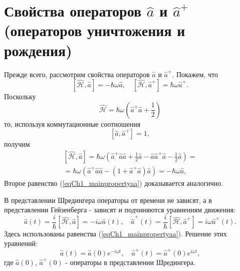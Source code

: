 \section{Свойства операторов $ \hat a $ и $ \hat a ^+ $ (операторов
  уничтожения и рождения)} 
Прежде всего, рассмотрим свойства операторов $\hat{a}$  и
$\hat{a}^{+}$.  Покажем, что 
\begin{equation}
\left[\hat{\mathcal{H}}, \hat{a}\right] = 
- \hbar \omega \hat{a}, \quad
\left[\hat{\mathcal{H}}, \hat{a}^{+}\right] = 
\hbar \omega \hat{a}^{+}.
\label{eqCh1_mainpropertyaa}
\end{equation}
Поскольку  
\[
\hat{\mathcal{H}} =  
\hbar \omega \left(\hat{a}^{+} \hat{a} +
\frac{1}{2}\right)
\]
то, используя коммутационные соотношения
\[
\left[\hat{a}, \hat{a}^{+}\right] = 1,
\]  
получим
\begin{eqnarray}
\left[\hat{\mathcal{H}}, \hat{a}\right] = 
\hbar \omega \left( 
\hat{a}^{+}\hat{a}\hat{a} + \frac{1}{2} \hat{a} -
\hat{a}\hat{a}^{+}\hat{a} - \frac{1}{2}\hat{a} 
\right)
= 
\nonumber \\ 
= \hbar \omega\left(
\hat{a}^{+}\hat{a}\hat{a} - \left(1 + \hat{a}^{+}\hat{a}\right)\hat{a} 
\right) = - \hbar \omega \hat{a} 
,
\nonumber
\end{eqnarray}
Второе равенство (\ref{eqCh1_mainpropertyaa}) доказывается
аналогично. 

В представлении Шредингера операторы от времени не зависят, а в
представлении Гейзенберга - зависят и подчиняются уравнениям движения: 
\begin{equation}
\dot{\hat{a}}\left(t\right) = \frac{i}{\hbar}\left[\hat{\mathcal{H}},
  \hat{a}\right] = -i \omega \hat{a}\left(t\right), \quad
\dot{\hat{a}}^{+}\left(t\right) = \frac{i}{\hbar}\left[\hat{\mathcal{H}},
  \hat{a}^{+}\right] = i \omega \hat{a}^{+}\left(t\right).
\label{eqCh1_54}
\end{equation}
Здесь использованы равенства (\ref{eqCh1_mainpropertyaa}). Решение
этих уравнений: 
\begin{equation}
\hat{a}\left(t\right) = \hat{a}\left(0\right) e^{- i \omega t}, \quad
\hat{a}^{+}\left(t\right) = \hat{a}^{+}\left(0\right) e^{i \omega t}, 
\end{equation}
где  $\hat{a}\left(0\right)$, $\hat{a}^{+}\left(0\right)$ - операторы
в представлении Шредингера.
